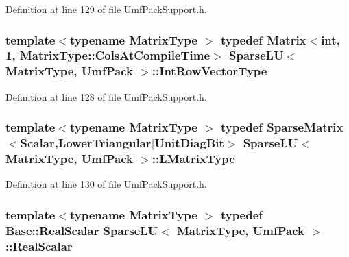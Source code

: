 Definition at line 129 of file Umf\-Pack\-Support.\-h.

\hypertarget{class_sparse_l_u_3_01_matrix_type_00_01_umf_pack_01_4_ad6789d8ef818adc250479ca6b0d7f340}{
\subsubsection[{Int\-Row\-Vector\-Type}]{\setlength{\rightskip}{0pt plus 5cm}template$<$typename Matrix\-Type $>$ typedef {\bf Matrix}$<${\bf int}, 1, Matrix\-Type\-::\-Cols\-At\-Compile\-Time$>$ {\bf Sparse\-L\-U}$<$ Matrix\-Type, {\bf Umf\-Pack} $>$\-::{\bf Int\-Row\-Vector\-Type}\hspace{0.3cm}{\ttfamily [protected]}}}\label{class_sparse_l_u_3_01_matrix_type_00_01_umf_pack_01_4_ad6789d8ef818adc250479ca6b0d7f340}


Definition at line 128 of file Umf\-Pack\-Support.\-h.

\hypertarget{class_sparse_l_u_3_01_matrix_type_00_01_umf_pack_01_4_a2900542d2fe0efa2c2d858cd9ca9953f}{
\subsubsection[{L\-Matrix\-Type}]{\setlength{\rightskip}{0pt plus 5cm}template$<$typename Matrix\-Type $>$ typedef {\bf Sparse\-Matrix}$<${\bf Scalar},{\bf Lower\-Triangular}$|${\bf Unit\-Diag\-Bit}$>$ {\bf Sparse\-L\-U}$<$ Matrix\-Type, {\bf Umf\-Pack} $>$\-::{\bf L\-Matrix\-Type}\hspace{0.3cm}{\ttfamily [protected]}}}\label{class_sparse_l_u_3_01_matrix_type_00_01_umf_pack_01_4_a2900542d2fe0efa2c2d858cd9ca9953f}


Definition at line 130 of file Umf\-Pack\-Support.\-h.

\hypertarget{class_sparse_l_u_3_01_matrix_type_00_01_umf_pack_01_4_aba7325df91db6de407bfe82b22d97c71}{
\subsubsection[{Real\-Scalar}]{\setlength{\rightskip}{0pt plus 5cm}template$<$typename Matrix\-Type $>$ typedef {\bf Base\-::\-Real\-Scalar} {\bf Sparse\-L\-U}$<$ Matrix\-Type, {\bf Umf\-Pack} $>$\-::{\bf Real\-Scalar}\hspace{0.3cm}{\ttfamily [protected]}}}\label{class_sparse_l_u_3_01_matrix_type_00_01_umf_pack_01_4_aba7325df91db6de407bfe82b22d97c71}


